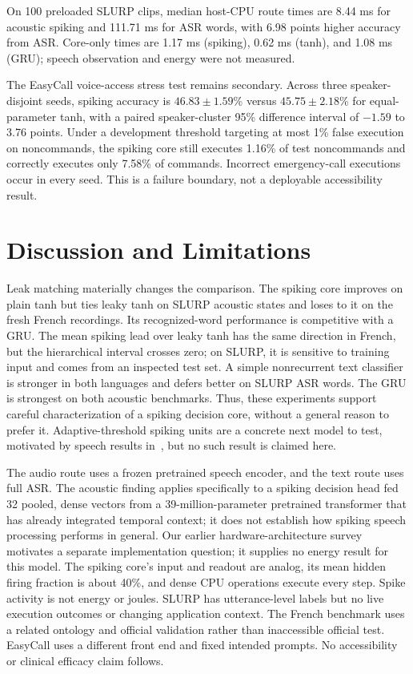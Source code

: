 \documentclass[conference]{IEEEtran}
\begin{document}
On 100 preloaded SLURP clips, median host-CPU route times are 8.44 ms for acoustic spiking and 111.71 ms for ASR words, with 6.98 points higher accuracy from ASR. Core-only times are 1.17 ms (spiking), 0.62 ms (tanh), and 1.08 ms (GRU); speech observation and energy were not measured.

The EasyCall voice-access stress test remains secondary. Across three speaker-disjoint seeds, spiking accuracy is $46.83\pm1.59$\% versus $45.75\pm2.18$\% for equal-parameter tanh, with a paired speaker-cluster 95\% difference interval of $-1.59$ to 3.76 points. Under a development threshold targeting at most 1\% false execution on noncommands, the spiking core still executes 1.16\% of test noncommands and correctly executes only 7.58\% of commands. Incorrect emergency-call executions occur in every seed. This is a failure boundary, not a deployable accessibility result.

\section{Discussion and Limitations}
Leak matching materially changes the comparison. The spiking core improves on plain tanh but ties leaky tanh on SLURP acoustic states and loses to it on the fresh French recordings. Its recognized-word performance is competitive with a GRU. The mean spiking lead over leaky tanh has the same direction in French, but the hierarchical interval crosses zero; on SLURP, it is sensitive to training input and comes from an inspected test set. A simple nonrecurrent text classifier is stronger in both languages and defers better on SLURP ASR words. The GRU is strongest on both acoustic benchmarks. Thus, these experiments support careful characterization of a spiking decision core, without a general reason to prefer it. Adaptive-threshold spiking units are a concrete next model to test, motivated by speech results in~\cite{yin,bittar}, but no such result is claimed here.

The audio route uses a frozen pretrained speech encoder, and the text route uses full ASR. The acoustic finding applies specifically to a spiking decision head fed 32 pooled, dense vectors from a 39-million-parameter pretrained transformer that has already integrated temporal context; it does not establish how spiking speech processing performs in general. Our earlier hardware-architecture survey~\cite{berhanu_hardware} motivates a separate implementation question; it supplies no energy result for this model. The spiking core's input and readout are analog, its mean hidden firing fraction is about 40\%, and dense CPU operations execute every step. Spike activity is not energy or joules. SLURP has utterance-level labels but no live execution outcomes or changing application context. The French benchmark uses a related ontology and official validation rather than inaccessible official test. EasyCall uses a different front end and fixed intended prompts. No accessibility or clinical efficacy claim follows.
\end{document}

